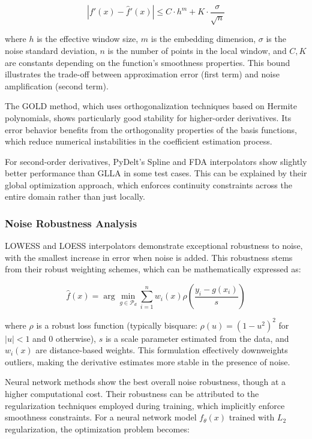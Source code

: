 \documentclass[10pt,journal,compsoc]{IEEEtran}
\begin{document}
\begin{equation}
    |f'(x) - \hat{f}'(x)| \leq C \cdot h^m + K \cdot \frac{\sigma}{\sqrt{n}}
\end{equation}

where $h$ is the effective window size, $m$ is the embedding dimension, $\sigma$ is the noise standard deviation, $n$ is the number of points in the local window, and $C, K$ are constants depending on the function's smoothness properties. This bound illustrates the trade-off between approximation error (first term) and noise amplification (second term).

The GOLD method, which uses orthogonalization techniques based on Hermite polynomials, shows particularly good stability for higher-order derivatives. Its error behavior benefits from the orthogonality properties of the basis functions, which reduce numerical instabilities in the coefficient estimation process.

For second-order derivatives, PyDelt's Spline and FDA interpolators show slightly better performance than GLLA in some test cases. This can be explained by their global optimization approach, which enforces continuity constraints across the entire domain rather than just locally.

\subsubsection{Noise Robustness Analysis}

LOWESS and LOESS interpolators demonstrate exceptional robustness to noise, with the smallest increase in error when noise is added. This robustness stems from their robust weighting schemes, which can be mathematically expressed as:

\begin{equation}
    \hat{f}(x) = \arg\min_{g \in \mathcal{P}_d} \sum_{i=1}^{n} w_i(x) \rho\left(\frac{y_i - g(x_i)}{s}\right)
\end{equation}

where $\rho$ is a robust loss function (typically bisquare: $\rho(u) = (1-u^2)^2$ for $|u| < 1$ and 0 otherwise), $s$ is a scale parameter estimated from the data, and $w_i(x)$ are distance-based weights. This formulation effectively downweights outliers, making the derivative estimates more stable in the presence of noise.

Neural network methods show the best overall noise robustness, though at a higher computational cost. Their robustness can be attributed to the regularization techniques employed during training, which implicitly enforce smoothness constraints. For a neural network model $f_{\theta}(x)$ trained with $L_2$ regularization, the optimization problem becomes:
\end{document}
